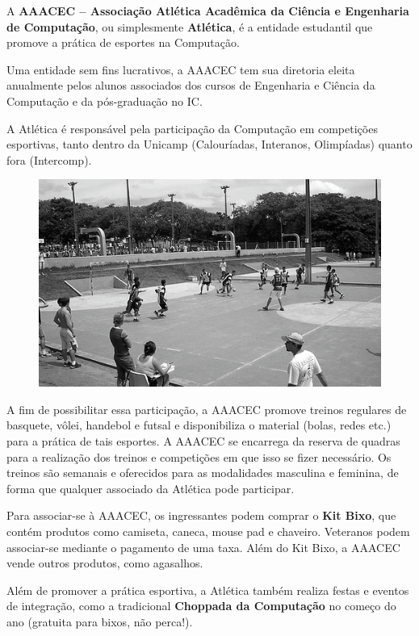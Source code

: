 A \textbf{AAACEC -- Associação Atlética Acadêmica da Ciência e Engenharia de
Computação}, ou simplesmente \textbf{Atlética}, é a entidade estudantil que
promove a prática de esportes na Computação.

Uma entidade sem fins lucrativos, a AAACEC tem sua diretoria eleita anualmente
pelos alunos associados dos cursos de Engenharia e Ciência da Computação e da
pós-graduação no IC.

A Atlética é responsável pela participação da Computação em competições
esportivas, tanto dentro da Unicamp (Calouríadas, Interanos, Olimpíadas) quanto
fora (Intercomp).

\begin{figure}[H]
    \centering
    \includegraphics[scale=0.55]{img/imgs/20-aaacec/-128.jpg}
\end{figure}

A fim de possibilitar essa participação, a AAACEC promove treinos regulares de
basquete, vôlei, handebol e futsal e disponibiliza o material (bolas, redes
etc.) para a prática de tais esportes. A AAACEC se encarrega da reserva de
quadras para a realização dos treinos e competições em que isso se fizer
necessário. Os treinos são semanais e oferecidos para as modalidades masculina e
feminina, de forma que qualquer associado da Atlética pode participar.

Para associar-se à AAACEC, os ingressantes podem comprar o \textbf{Kit Bixo}, que contém
produtos como camiseta, caneca, mouse pad e chaveiro. Veteranos podem
associar-se mediante o pagamento de uma taxa. Além do Kit Bixo, a AAACEC vende
outros produtos, como agasalhos.

Além de promover a prática esportiva, a Atlética também realiza festas e eventos
de integração, como a tradicional \textbf{Choppada da Computação} no começo do
ano (gratuita para bixos, não perca!).

